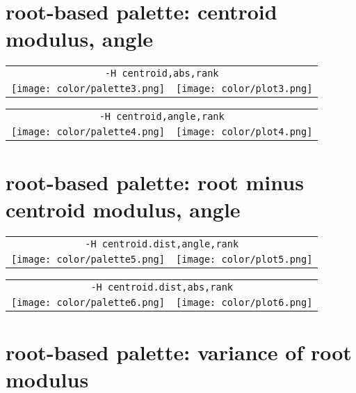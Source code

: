 \documentclass{article}
\begin{document}
\newpage
\section{root-based palette: centroid modulus, angle}

\begin{center}
\begin{tabular}{m{8cm}m{8cm}}
\multicolumn{2}{c}{\tt -H centroid,abs,rank} \\
\texttt{[image: color/palette3.png]} &
\texttt{[image: color/plot3.png]}
\end{tabular}
\end{center}

\begin{center}
\begin{tabular}{m{8cm}m{8cm}}
\multicolumn{2}{c}{\tt -H centroid,angle,rank} \\
\texttt{[image: color/palette4.png]} &
\texttt{[image: color/plot4.png]}
\end{tabular}
\end{center}

\newpage
\section{root-based palette: root minus centroid modulus, angle}

\begin{center}
\begin{tabular}{m{8cm}m{8cm}}
\multicolumn{2}{c}{\tt -H centroid.dist,angle,rank} \\
\texttt{[image: color/palette5.png]} &
\texttt{[image: color/plot5.png]}
\end{tabular}
\end{center}

\begin{center}
\begin{tabular}{m{8cm}m{8cm}}
\multicolumn{2}{c}{\tt -H centroid.dist,abs,rank} \\
\texttt{[image: color/palette6.png]} &
\texttt{[image: color/plot6.png]}
\end{tabular}
\end{center}

\newpage
\section{root-based palette: variance of root modulus}
\end{document}
